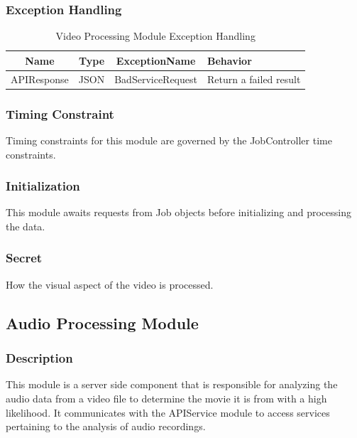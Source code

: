 \documentclass{article}
\begin{document}
\subsubsection{Exception Handling}
\begin{table}[H]
    \caption{Video Processing Module Exception Handling}
    \centering
    \begin{tabularx}{0.7\textwidth}{|c|c|c|X|} \hline
        \textbf{Name} & \textbf{Type} & \textbf{ExceptionName} & \textbf{Behavior} \\ \hline
        APIResponse & JSON & BadServiceRequest & Return a failed result \\ \hline
    \end{tabularx}
    \label{tab:Video_Processing_Exception}
\end{table}

\subsubsection{Timing Constraint}
Timing constraints for this module are governed by the JobController time constraints. 

\subsubsection{Initialization}
This module awaits requests from Job objects before initializing and processing the data.

\subsubsection{Secret}
How the visual aspect of the video is processed.

\subsection{Audio Processing Module}

\subsubsection{Description}

This module is a server side component that is responsible for analyzing the audio data from a video file to determine the movie it is from with a high likelihood. It communicates with the APIService module to access services pertaining to the analysis of audio recordings.
\end{document}

